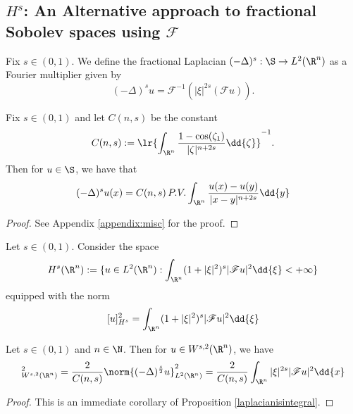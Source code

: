 \documentclass[../main.tex]{subfiles}
\begin{document}
\subsection{$ H^{s} $: An Alternative approach to fractional Sobolev spaces using $ \mathscr{F} $}
\begin{definition}
    Fix $ s\in (0,1) $. We define the fractional Laplacian $ (-\Delta)^{s}:\S\to L^{2}(\R^{n}) $ as a Fourier multiplier given by
    \[
        (-\Delta)^{s}u = \mathscr{F}^{-1} (| \xi|^{2s}( \mathscr{F}u)).
    \]
\end{definition}

\begin{proposition}\label{laplacianisintegral}
    Fix $ s\in (0,1) $ and let $ C(n,s) $ be the constant 
    \begin{equation}
        C(n,s) := \lr{ \int_{\R^{n}}\frac{1-\cos(\zeta_{1})}{| \zeta|^{n+2s}}\dd{\zeta}  }^{-1}.
    \end{equation}
    Then for $ u\in \S $, we have that 
    \begin{equation}
        (-\Delta )^{s}u(x) = C(n,s)\, P.V. \int_{\R^{n}} \frac{u(x) - u(y)}{|x-y|^{n+2s}} \dd{y}
    \end{equation}
\end{proposition}

\begin{proof}
    See Appendix \ref{appendix:misc} for the proof.
\end{proof}



\begin{definition}
    Let $ s\in (0,1) $. Consider the space
    \[
         H^{s}(\R^{n}) := \{ u\in L^{2}(\R^{n}): \int_{\R^{n}}(1+| \xi|^{2})^{s}|\mathscr{F}u|^{2}\dd{\xi} < +\infty\} 
    \]
    equipped with the norm
    \[
        [u]_{H^{s}}^{2} = \int_{\R^{n}}(1+| \xi|^{2})^{s}|\mathscr{F}u|^{2}\dd{\xi} 
    \]
\end{definition}



\begin{proposition}\label{fracnormislaplacian}
    Let $ s\in (0,1) $ and $ n\in \N $. Then for $ u\in W^{s,2}(\R^{n}) $, we have 
    \begin{equation}
        [u]_{W^{s,2}(\R^{n})}^{2} = \frac{2}{C(n,s)} \norm{(-\Delta )^{\frac{s}{2}}u}_{L^{2}(\R^{n})}^{2} = \frac{2}{C(n,s)} \int_{\R^{n}} | \xi|^{2s} |\mathscr{F}u|^{2} \dd{x} 
    \end{equation}
\end{proposition}

\begin{proof}
    This is an immediate corollary of Proposition \ref{laplacianisintegral}.
\end{proof}
\end{document}
